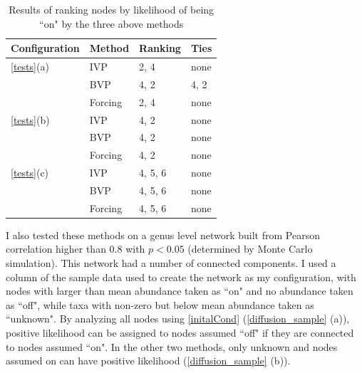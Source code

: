 \documentclass[10pt]{article}
\theoremstyle{definition}
\numberwithin{theorem}{section}
\numberwithin{definition}{section}
\numberwithin{lemma}{section}
\numberwithin{corollary}{section}
\numberwithin{clm}{section}
\numberwithin{rmk}{section}
\begin{document}
\begin{table}
	\begin{center}
\begin{tabular}{|l|l|l|l|}
	\hline Configuration & Method & Ranking & Ties\\
	\hline
	\cref{tests}(a) &  IVP & 2, 4 & none  \\ \cline{2-4}
	 & BVP & 4, 2 & 4, 2 \\ \cline{2-4}
	 & Forcing & 2, 4 & none \\
	\hline
		\cref{tests}(b) &  IVP & 4, 2 &none \\ \cline{2-4}
	& BVP &4, 2 & none  \\ \cline{2-4}
	& Forcing &4, 2 & none\\
	\hline
		\cref{tests}(c) &  IVP & 4, 5, 6& none \\ \cline{2-4}
	& BVP & 4, 5, 6&  none\\ \cline{2-4}
	& Forcing &  4, 5, 6& none \\
	\hline
\end{tabular}
\end{center}
\caption{Results of ranking nodes by likelihood of being ``on" by the three above methods}\label{rankres}
\end{table}
	
I also tested these methods on a genus level network built from Pearson correlation higher than $0.8$ with $p < 0.05$ (determined by Monte Carlo simulation). This network had a number of connected components. I used a column of the sample data used to create the network as my configuration, with nodes with larger than mean abundance taken as ``on" and no abundance taken as ``off", while taxa with non-zero but below mean abundance taken as ``unknown". By analyzing all nodes using \cref{initalCond} (\cref{diffusion_sample} (a)), positive likelihood can be assigned to nodes assumed ``off" if they are connected to nodes assumed ``on". In the other two methods, only unknown and nodes assumed on can have positive likelihood (\cref{diffusion_sample} (b)).
\end{document}
